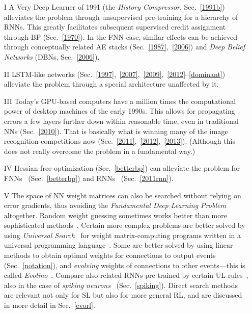 \documentclass[letterpaper]{article}
\begin{document}
\begin{CJK*}{UTF8}{gbsn}
\begin{itemize}
\item[I]
A Very Deep Learner of 1991 (the {\em History Compressor}, Sec.~\ref{1991b}) alleviates the problem through unsupervised pre-training for a hierarchy of RNNs. This greatly facilitates subsequent supervised credit assignment through BP (Sec.~\ref{1970}).
In the FNN case, similar effects can be achieved through conceptually related AE stacks (Sec.~\ref{1987},~\ref{2006}) and {\em Deep Belief Networks} (DBNs, Sec.~\ref{2006}).

\item[II]
LSTM-like networks (Sec.~\ref{1997},~\ref{2007},~\ref{2009},~\ref{2012}--\ref{dominant}) alleviate
 the problem through a special architecture unaffected by it.

\item[III]
Today's
GPU-based computers have a million times the computational power of desktop machines  of the early 1990s. 
This
allows for propagating errors a few layers further down within reasonable time, 
even in traditional NNs (Sec.~\ref{2010}). That is basically what is winning many of the image 
recognition competitions now (Sec.~\ref{2011},~\ref{2012},~\ref{2013}). (Although this does not really overcome the problem in a fundamental way.) 

\item[IV] 
Hessian-free optimization (Sec.~\ref{betterbp})
can alleviate the problem for FNNs~\citep{Moller:93,Pearlmutter:93,schraudolph02,icml2010_094} (Sec.~\ref{betterbp})
and RNNs~\citep{Martens:2011hessfree} (Sec.~\ref{2011rnn}).

\item[V] The space of NN weight matrices can also be searched without relying on error gradients,
thus avoiding the {\em Fundamental Deep Learning Problem} altogether.
Random weight guessing sometimes works better
than more sophisticated methods~\citep{Hochreiter:96sintra}.
Certain more complex problems are better solved by using 
{\em Universal Search}~\citep{Levin:73} for weight matrix-computing programs written in
a universal programming language~\citep{Schmidhuber:97nn+}.
Some are better solved by using linear methods 
to obtain optimal weights for connections to output events (Sec.~\ref{notation}),
and  {\em evolving} weights of connections to other events---this is called {\em Evolino}~\citep{Schmidhuber:07nc}.
Compare also related RNNs pre-trained by certain UL rules~\citep{steil2007},
also in the case of {\em spiking  neurons}~\citep{yin2012,maass2013} (Sec.~\ref{spiking}).
Direct search methods are relevant not only for SL but also for more general RL,
and are discussed in more detail in Sec.~\ref{evorl}.




\end{itemize}
\end{CJK*}
\end{document}
